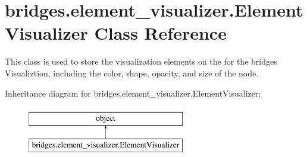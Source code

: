 \hypertarget{classbridges_1_1element__visualizer_1_1_element_visualizer}{}\section{bridges.\+element\+\_\+visualizer.\+Element\+Visualizer Class Reference}
\label{classbridges_1_1element__visualizer_1_1_element_visualizer}


This class is used to store the visualization elements on the for the bridges Visualiztion, including the color, shape, opacity, and size of the node.  


Inheritance diagram for bridges.\+element\+\_\+visualizer.\+Element\+Visualizer\+:\begin{figure}[H]
\begin{center}
\leavevmode
\includegraphics[height=2.000000cm]{classbridges_1_1element__visualizer_1_1_element_visualizer}
\end{center}
\end{figure}
